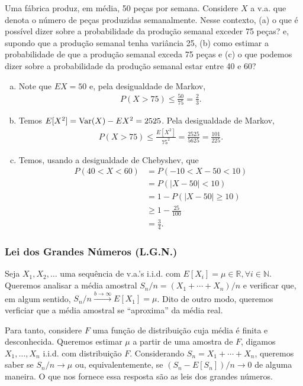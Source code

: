 \documentclass[../Notas.tex]{subfiles}
\begin{document}
\begin{example}
Uma fábrica produz, em média, 50 peças por semana. Considere $X$ a v.a. que denota o número de peças produzidas semanalmente. Nesse contexto, (a) o que é possível dizer sobre a probabilidade da produção semanal exceder 75 peças? e, supondo que a produção semanal tenha variância 25, (b) como estimar a probabilidade de que a produção semanal exceda 75 peças e (c) o que podemos dizer sobre a probabilidade da produção semanal estar entre 40 e 60?
\begin{enumerate}[(a)]
    \item Note que $EX = 50$ e, pela desigualdade de Markov,
    \begin{align*}
        P(X>75) \leq \frac{50}{75} = \frac{2}{3}.
    \end{align*}
    \item Temos $E[X^2] = \text{Var}(X) - EX^2 = 2525$. Pela desigualdade de Markov,
    \begin{align*}
        P(X>75) \leq \frac{E[X^2]}{75^2} = \frac{2525}{5625} = \frac{101}{225}.
    \end{align*}
    \item Temos, usando a desigualdade de Chebyshev, que
    \begin{align*}
        P(40 < X < 60) &= P(-10 < X-50 < 10) \\
        &= P(|X-50|<10) \\
        &= 1 - P(|X-50|\geq 10) \\
        &\geq 1 - \frac{25}{100} \\
        &= \frac{3}{4}.
    \end{align*}
\end{enumerate}
\end{example}

\subsubsection{Lei dos Grandes Números (L.G.N.)}
Seja $X_1, X_2, \dots$ uma sequência de v.a.'s i.i.d. com $E[X_i] = \mu\in\mathbb{R}, \forall i\in\mathbb{N}$. Queremos analisar a média amostral $S_n/n = (X_1 + \cdots + X_n)/n$ e verificar que, em algum sentido, $S_n/n \xrightarrow{b\to\infty} E[X_1] = \mu$. Dito de outro modo, queremos verficiar que a média amostral se ``aproxima'' da média real. 

Para tanto, considere $F$ uma função de distribuição cuja média é finita e desconhecida. Queremos estimar $\mu$ a partir de uma amostra de $F$, digamos $X_1, \dots, X_n$ i.i.d. com distribuição $F$. Considerando $S_n = X_1 + \cdots + X_n$, queremos saber se $S_n/n\to\mu$ ou, equivalentemente, se $(S_n - E[S_n])/n\to 0$ de alguma maneira. O que nos fornece essa resposta são as leis dos grandes números.
\end{document}
